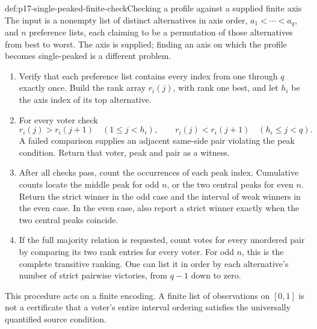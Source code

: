 \begin{hbmethod}{def:p17-single-peaked-finite-check}{Checking a profile against a supplied finite axis}
The input is a nonempty list of distinct alternatives in axis order,
\(a_1<\cdots<a_q\), and \(n\) preference lists, each claiming to
be a permutation of those alternatives from best to worst. The axis
is supplied; finding an axis on which the profile becomes single-peaked
is a different problem.
\begin{enumerate}
\item Verify that each preference list contains every index from one
      through \(q\) exactly once. Build the rank array \(r_i(j)\),
      with rank one best, and let \(h_i\) be the axis index of its
      top alternative.
\item For every voter check
      \[
       r_i(j)>r_i(j+1)\quad(1\leq j<h_i),\qquad
       r_i(j)<r_i(j+1)\quad(h_i\leq j<q).
      \]
      A failed comparison supplies an adjacent same-side pair violating
      the peak condition. Return that voter, peak and pair as a witness.
\item After all checks pass, count the occurrences of each peak index.
      Cumulative counts locate the middle peak for odd \(n\), or the
      two central peaks for even \(n\). Return the strict winner in
      the odd case and the interval of weak winners in the even case.
      In the even case, also report a strict winner exactly when the
      two central peaks coincide.
\item If the full majority relation is requested, count votes for every
      unordered pair by comparing its two rank entries for every voter.
      For odd \(n\), this is the complete transitive ranking. One can
      list it in order by each alternative's number of strict pairwise
      victories, from \(q-1\) down to zero.
\end{enumerate}
This procedure acts on a finite encoding. A finite list of observations
on \([0,1]\) is not a certificate that a voter's entire interval
ordering satisfies the universally quantified source condition.
\end{hbmethod}

